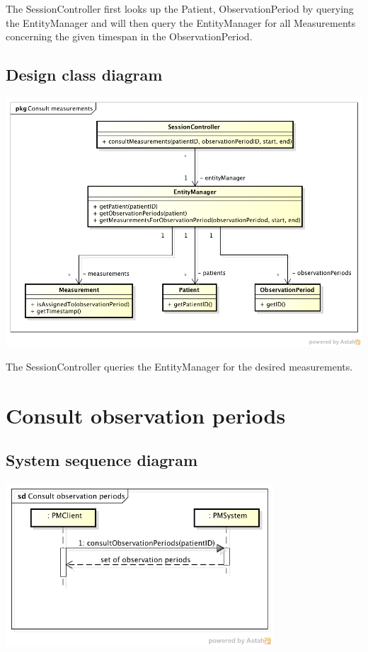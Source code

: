 \documentclass[fontsize=12pt,
               paper=a4,
               twoside=false,
               parskip=half,
               ]{scrartcl}
\begin{document}
The SessionController first looks up the Patient, ObservationPeriod by querying the EntityManager and will then query the EntityManager for all Measurements concerning the given timespan in the ObservationPeriod.

\subsection{Design class diagram}


\includegraphics[width=15cm]{./img/design-class-diagrams/consult-measurements.png}

The SessionController queries the EntityManager for the desired measurements.

\section{Consult observation periods}

\subsection{System sequence diagram}

\includegraphics[width=10cm]{./img/system-sequence-diagrams/consult-observation-periods.png}
\end{document}
